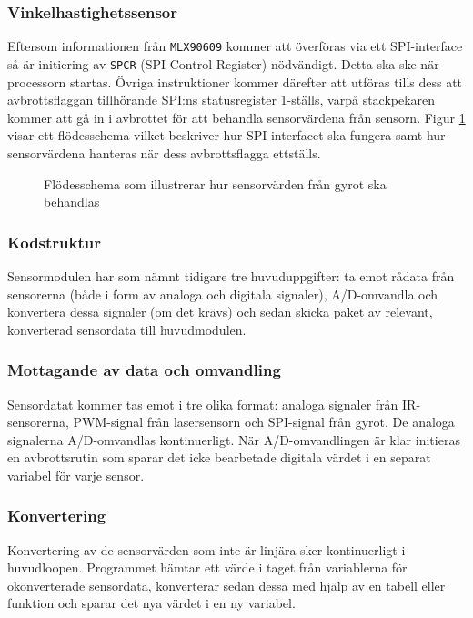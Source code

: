 \documentclass[11pt]{article}
\begin{document}
\begin{flushleft}
\subsubsection{Vinkelhastighetssensor}
Eftersom informationen från \verb+MLX90609+ kommer att överföras via ett SPI-interface så är initiering av \verb+SPCR+ (SPI Control Register) nödvändigt. Detta ska ske när processorn startas. Övriga instruktioner kommer därefter att utföras tills dess att avbrottsflaggan tillhörande SPI:ns statusregister 1-ställs, varpå stackpekaren kommer att gå in i avbrottet för att behandla sensorvärdena från sensorn. Figur \ref{Avbrott_SPI} visar ett flödesschema vilket beskriver hur SPI-interfacet ska fungera samt hur sensorvärdena hanteras när dess avbrottsflagga ettställs.
\begin{figure}[htbp]
\centering
\noindent\resizebox{.5\linewidth}{!}{
	}
	\caption{Flödesschema som illustrerar hur sensorvärden från gyrot ska behandlas\label{Avbrott_SPI}}	
\end{figure}
\pagebreak %

\subsubsection{Kodstruktur}
Sensormodulen har som nämnt tidigare tre huvuduppgifter: ta emot rådata från sensorerna (både i form av analoga och digitala signaler), A/D-omvandla och konvertera dessa signaler (om det krävs) och sedan skicka paket av relevant, konverterad sensordata till huvudmodulen.

\subsubsection{Mottagande av data och omvandling}
Sensordatat kommer tas emot i tre olika format: analoga signaler från IR-sensorerna, PWM-signal från lasersensorn och SPI-signal från gyrot. De analoga signalerna A/D-omvandlas kontinuerligt. När A/D-omvandlingen är klar initieras en avbrottsrutin som sparar det icke bearbetade digitala värdet i en separat variabel för varje sensor. %

\subsubsection{Konvertering}
Konvertering av de sensorvärden som inte är linjära sker kontinuerligt i huvudloopen. Programmet hämtar ett värde i taget från variablerna för okonverterade sensordata, konverterar sedan dessa med hjälp av en tabell eller funktion och sparar det nya värdet i en ny variabel. 


\end{flushleft}
\end{document}
